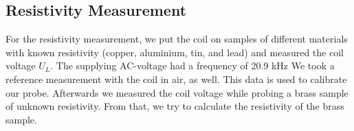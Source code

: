 \subsection{Resistivity Measurement} 
For the resistivity measurement, we put the coil on samples of different materials with known resistivity (copper, aluminium, tin, and lead) and measured the coil voltage $U_L$. The supplying AC-voltage had a frequency of 20.9 kHz We took a reference measurement with the coil in air, as well. This data is used to calibrate our probe. Afterwards we measured the coil voltage while probing a brass sample of unknown resistivity. From that, we try to calculate the resistivity of the brass sample.
